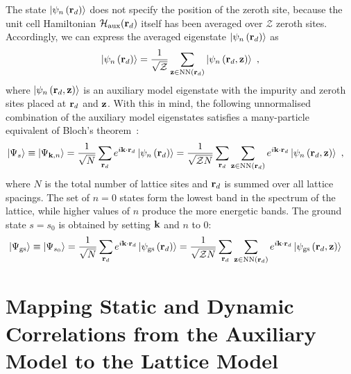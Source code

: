 \documentclass[reprint,hidelinks,onecolumn]{revtex4-2}
\begin{document}
The state \(\ket{\psi_n\left({\bf r}_d\right)}\) does not specify the position of the zeroth site, because the unit cell Hamiltonian \(\mathcal{H}_\text{aux}({\bf r}_d)\) itself has been averaged over \(\mathcal{Z}\) zeroth sites. Accordingly, we can express the averaged eigenstate \(\ket{\psi_n\left({\bf r}_d\right)}\) as
\begin{equation}\begin{aligned}
	\ket{\psi_n\left({\bf r}_d\right)} = \frac{1}{\sqrt\mathcal{Z}}\sum_{{\bf z} \in \text{NN}({\bf r}_d)}\ket{\psi_n\left({\bf r}_d, {\bf z}\right)}~,
\end{aligned}\end{equation}
where \(\ket{\psi_n\left({\bf r}_d, {\bf z}\right)}\) is an auxiliary model eigenstate with the impurity and zeroth sites placed at \({\bf r}_d\) and \({\bf z}\). With this in mind, the following unnormalised combination of the auxiliary model eigenstates satisfies a many-particle equivalent of Bloch's theorem~\cite{stoyanova}:
\begin{equation}\begin{aligned}\label{eigenstateProposal}
	\ket{\Psi_{s}} \equiv \ket{\Psi_{{\bf k}, n}} &= \frac{1}{\sqrt N}\sum_{{\bf r}_d} e^{i {\bf k}\cdot{\bf r}_d} \ket{\psi_{n}\left({\bf r}_d\right)} = \frac{1}{\sqrt{\mathcal{Z} N}}\sum_{{\bf r}_d}\sum_{{\bf z} \in \text{NN}({\bf r}_d)} e^{i {\bf k}\cdot{\bf r}_d} \ket{\psi_{n}\left({\bf r}_d, {\bf z}\right)}~,
\end{aligned}\end{equation}
where \(N\) is the total number of lattice sites and \({\bf r}_d\) is summed over all lattice spacings. The set of \(n=0\) states form the lowest band in the spectrum of the lattice, while higher values of \(n\) produce the more energetic bands. The ground state \(s = s_0\) is obtained by setting \({\bf k}\) and \(n\) to 0:
\begin{equation}\begin{aligned}\label{groundstateProposal}
	\ket{\Psi_\text{gs}} \equiv \ket{\Psi_{s_0}} &= \frac{1}{\sqrt N}\sum_{{\bf r}_d} e^{i {\bf k}\cdot{\bf r}_d} \ket{\psi_\text{gs}\left({\bf r}_d\right)} = \frac{1}{\sqrt{\mathcal{Z} N}}\sum_{{\bf r}_d}\sum_{{\bf z} \in \text{NN}({\bf r}_d)} e^{i {\bf k}\cdot{\bf r}_d} \ket{\psi_\text{gs}\left({\bf r}_d, {\bf z}\right)}
\end{aligned}\end{equation}


\section{Mapping Static and Dynamic Correlations from the Auxiliary Model to the Lattice Model}\label{tilingProcedure}
\end{document}
